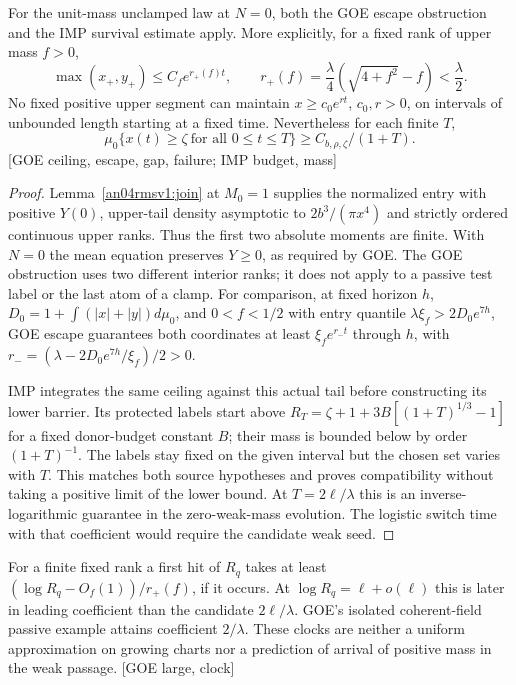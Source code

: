 \documentclass[11pt]{article}
\newcommand{\src}[1]{\textnormal{\small[#1]}}
\begin{document}
\begin{lemma}
\label{an04rmsv1:horizons}
For the unit-mass unclamped law at \(N=0\), both the GOE escape
obstruction and the IMP survival estimate apply. More explicitly,
for a fixed rank of upper mass \(f>0\),
\[
 \max(x_+,y_+)\le C_fe^{r_+(f)t},\qquad
 r_+(f)=\frac{\lambda}{4}(\sqrt{4+f^2}-f)<\frac\lambda2.
\]
No fixed positive upper segment can maintain \(x\ge c_0e^{rt}\),
\(c_0,r>0\), on intervals of unbounded length starting at a fixed time.
Nevertheless for each finite \(T\),
\[
 \mu_0\{x(t)\ge\zeta\ \text{for all }0\le t\le T\}
 \ge C_{b,\rho,\zeta}/(1+T).
\]
\src{GOE ceiling, escape, gap, failure; IMP budget, mass}
\end{lemma}
\begin{proof}
Lemma~\ref{an04rmsv1:join} at \(M_0=1\) supplies the normalized
entry with positive \(Y(0)\), upper-tail density asymptotic to
\(2b^3/(\pi x^4)\) and strictly ordered continuous upper ranks.
Thus the first two absolute moments are finite. With \(N=0\)
the mean equation preserves \(Y\ge0\), as required by GOE.
The GOE obstruction uses two different interior ranks; it does not
apply to a passive test label or the last atom of a clamp.
For comparison, at fixed horizon \(h\), \(D_0=1+\int(|x|+|y|)d\mu_0\),
and \(0<f<1/2\) with entry quantile
\(\lambda\xi_f>2D_0 e^{7h}\), GOE escape guarantees both coordinates
at least \(\xi_f e^{r_- t}\) through \(h\), with
\(r_-=(\lambda-2D_0e^{7h}/\xi_f)/2>0\).

IMP integrates the same ceiling against this actual tail before
constructing its lower barrier. Its protected labels start above
\(R_T=\zeta+1+3B[(1+T)^{1/3}-1]\) for a fixed donor-budget constant
\(B\); their mass is bounded below by order \((1+T)^{-1}\).
The labels stay fixed on the given interval but the chosen set
varies with \(T\). This matches both source hypotheses and proves
compatibility without taking a positive limit of the lower bound.
At \(T=2\ell/\lambda\) this is an inverse-logarithmic guarantee
in the zero-weak-mass evolution. The logistic switch time with
that coefficient would require the candidate weak seed.
\end{proof}

For a finite fixed rank a first hit of \(R_q\) takes at least
\((\log R_q-O_f(1))/r_+(f)\), if it occurs. At
\(\log R_q=\ell+o(\ell)\) this is later in leading coefficient than
the candidate \(2\ell/\lambda\). GOE's isolated coherent-field
passive example attains coefficient \(2/\lambda\). These clocks
are neither a uniform approximation on growing charts nor a prediction
of arrival of positive mass in the weak passage. \src{GOE large, clock}
\end{document}
